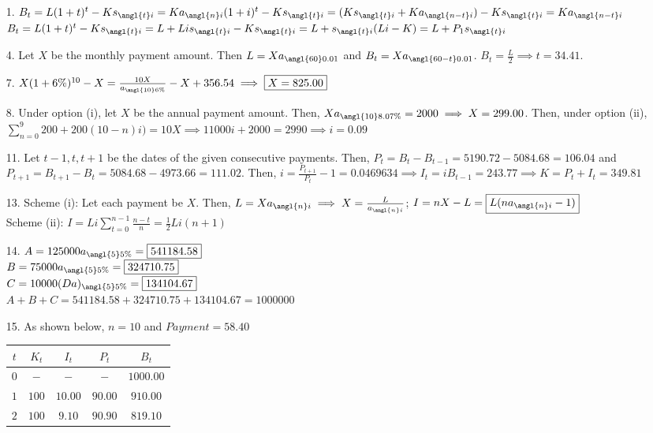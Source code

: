 \documentclass{article}
\begin{document}
\begin{itemize}
	\item [1.] $B_t=L(1+t)^t-Ks_{\angl{t}i}=Ka_{\angl{n}i}(1+i)^t-Ks_{\angl{t}i}=(Ks_{\angl{t}i}+Ka_{\angl{n-t}i})-Ks_{\angl{t}i}=Ka_{\angl{n-t}i}$\\$B_t=L(1+t)^t-Ks_{\angl{t}i}=L+Lis_{\angl{t}i}-Ks_{\angl{t}i}=L+s_{\angl{t}i}(Li-K)=L+P_1s_{\angl{t}i}$
	\item [4.] Let $X$ be the monthly payment amount. Then $L=Xa_{\angl{60}0.01}$ and $B_t=Xa_{\angl{60-t}0.01}$. $B_t=\frac{L}{2} \implies \boxed{t=34.41}$.
	\item [7.] $X(1+6\%)^{10}-X=\frac{10X}{a_{\angl{10}6\%}}-X+356.54 \implies \boxed{X=825.00}$
	\item [8.] Under option (i), let $X$ be the annual payment amount. Then, $Xa_{\angl{10}8.07\%}=2000 \implies X=299.00$. Then, under option (ii), $\sum_{n=0}^9 200+200(10-n)i)=10X \implies 11000i+2000=2990 \implies \boxed{i=0.09}$
	\item [11.] Let $t-1,t,t+1$ be the dates of the given consecutive payments. Then, $P_t=B_t-B_{t-1}=5190.72-5084.68=106.04$ and $P_{t+1}=B_{t+1}-B_t=5084.68-4973.66=111.02$. Then, $i=\frac{P_{t+1}}{P_t}-1=0.0469634 \implies I_t=iB_{t-1}=243.77 \implies K=P_t+I_t=\boxed{349.81}$
	\item [13.] Scheme (i): Let each payment be $X$. Then, $L=Xa_{\angl{n}i} \implies X=\frac{L}{a_{\angl{n}i}}$; $I=nX-L=\boxed{L(na_{\angl{n}i}-1)}$\\Scheme (ii): $I=Li\sum_{t=0}^{n-1}\frac{n-t}{n}=\boxed{\frac{1}{2}Li(n+1)}$
	\item [14.] $A=125000a_{\angl{5}5\%}=\boxed{541184.58}$\\$B=75000a_{\angl{5}5\%}=\boxed{324710.75}$\\$C=10000(Da)_{\angl{5}5\%}=\boxed{134104.67}$\\$A+B+C=541184.58+324710.75+134104.67=1000000$
	\item [15.] As shown below, $n=10$ and $Payment=58.40$\\
	      \begin{tabular}{|c|c|c|c|c|}
		      \hline
		      $t$  & $K_t$  & $I_t$   & $P_t$   & $B_t$     \\
		      \hline
		      $0$  & $-$    & $-$     & $-$     & $1000.00$    \\
		      \hline
		      $1$  & $100$ & $10.00$ & $90.00$ & $910.00$ \\
		      \hline
		      $2$  & $100$ & $9.10$ & $90.90$ & $819.10$ \\

\end{tabular}
\end{itemize}
\end{document}
